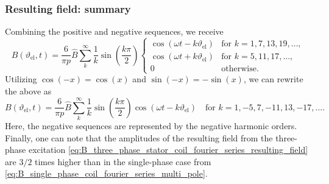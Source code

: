 \begin{frame}
	\frametitle{Resulting field: summary}
    Combining the positive and negative sequences, we receive
    \begin{equation}
        B(\vartheta_\mathrm{el}, t) = \frac{6}{\pi p} \hat{B} \sum_{k}^{\infty} \frac{1}{k} \sin\left(\frac{k \pi}{2}\right) \begin{cases}
            \cos(\omega t - k \vartheta_\mathrm{el}) & \text{for } k=1,7,13,19,\ldots, \\
            \cos(\omega t + k \vartheta_\mathrm{el}) & \text{for } k=5,11,17,\ldots, \\
            0 & \text{otherwise}.
        \end{cases}
    \end{equation}
    \pause
    Utilizing $\cos(-x)=\cos(x)$ and $\sin(-x)=-\sin(x)$, we can rewrite the above as
    \begin{equation}
        B(\vartheta_\mathrm{el}, t) = \frac{6}{\pi p} \hat{B} \sum_{k}^{\infty} \frac{1}{k} \sin\left(\frac{k \pi}{2}\right) \cos(\omega t - k \vartheta_\mathrm{el}) \quad \mbox{for } k=1,-5,7,-11,13,-17,\ldots.
        \label{eq:B_three_phase_stator_coil_fourier_series_resulting_field}
    \end{equation}
    \pause
    Here, the negative sequences are represented by the negative harmonic orders. Finally, one can note that the amplitudes of the resulting field from the three-phase excitation \eqref{eq:B_three_phase_stator_coil_fourier_series_resulting_field} are $3/2$ times higher than in the single-phase case from \eqref{eq:B_single_phase_coil_fourier_series_multi_pole}.
\end{frame}

